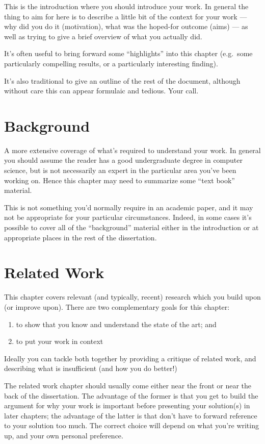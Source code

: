 \documentclass[a4paper,12pt,twoside,openright]{report}
\begin{document}
This is the introduction where you should introduce your work.  In
general the thing to aim for here is to describe a little bit of the
context for your work --- why did you do it (motivation), what was the
hoped-for outcome (aims) --- as well as trying to give a brief
overview of what you actually did.

It's often useful to bring forward some ``highlights'' into
this chapter (e.g.\ some particularly compelling results, or
a particularly interesting finding).

It's also traditional to give an outline of the rest of the
document, although without care this can appear formulaic
and tedious. Your call.


\chapter{Background}

A more extensive coverage of what's required to understand your
work. In general you should assume the reader has a good undergraduate
degree in computer science, but is not necessarily an expert in
the particular area you've been working on. Hence this chapter
may need to summarize some ``text book'' material.

This is not something you'd normally require in an academic paper,
and it may not be appropriate for your particular circumstances.
Indeed, in some cases it's possible to cover all of the ``background''
material either in the introduction or at appropriate places in
the rest of the dissertation.


\chapter{Related Work}

This chapter covers relevant (and typically, recent) research
which you build upon (or improve upon). There are two complementary
goals for this chapter:
\begin{enumerate}
  \item to show that you know and understand the state of the art; and
  \item to put your work in context
\end{enumerate}

Ideally you can tackle both together by providing a critique of
related work, and describing what is insufficient (and how you do
better!)

The related work chapter should usually come either near the front or
near the back of the dissertation. The advantage of the former is that
you get to build the argument for why your work is important before
presenting your solution(s) in later chapters; the advantage of the
latter is that don't have to forward reference to your solution too
much. The correct choice will depend on what you're writing up, and
your own personal preference.
\end{document}
